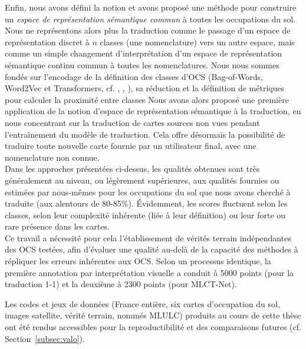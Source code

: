 Enfin, nous avons défini la notion et avons proposé une méthode pour construire un \textit{espace de représentation sémantique commun} à toutes les occupations du sol. Nous ne représentons alors plus la traduction comme le passage d'un espace de représentation discret à $n$ classes (une nomenclature) vers un autre espace, mais comme un simple changement d'interprétation d'un espace de représentation sémantique continu commun à toutes les nomenclatures. Nous nous sommes fondés sur l'encodage de la définition des classes d'OCS (Bag-of-Words, Word2Vec et Transformers, cf. \cite{Comber2015}, \cite{Pradhan2020}, \cite{Wang2020}), sa réduction et la définition de métriques pour calculer la proximité entre classes Nous avons alors proposé une première application de la notion d'espace de représentation sémantique à la traduction, en nous concentrant sur la traduction de cartes sources non vues pendant l’entraînement du modèle de traduction. Cela offre désormais la possibilité de traduire toute nouvelle carte fournie par un utilisateur final, avec une nomenclature non connue.\\

Dans les approches présentées ci-dessus, les qualités obtenues sont très généralement au niveau, ou légèrement supérieures, aux qualités fournies ou estimées par nous-mêmes pour les occupations du sol que nous avons cherché à traduite (aux alentours de 80-85\%). \'Evidemment, les scores fluctuent selon les classes, selon leur complexité inhérente (liée à leur définition) ou leur forte ou rare présence dans les cartes.\\
Ce travail a nécessité pour cela l'établissement de vérités terrain indépendantes des OCS testées, afin d'évaluer une qualité au-delà de la capacité des méthodes à répliquer les erreurs inhérentes aux OCS. Selon un processus identique, la première annotation par interprétation visuelle a conduit à 5000 points (pour la traduction 1-1) et la deuxième à 2300 points (pour MLCT-Net).

Les codes et jeux de données (France entière, six cartes d'occupation du sol, images satellite, vérité terrain, nommés MLULC) produits au cours de cette thèse ont été rendus accessibles pour la reproductibilité et des comparaisons futures (cf. Section~\ref{subsec:valo}).


